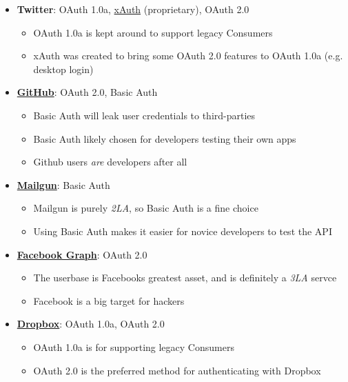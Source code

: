\documentclass{book}
\begin{document}
\begin{itemize}
\item \textbf{Twitter}: OAuth 1.0a, \href{https://dev.twitter.com/docs/oauth/xauth}{xAuth} (proprietary), OAuth 2.0
    \begin{itemize}
        \item OAuth 1.0a is kept around to support legacy Consumers
        \item xAuth was created to bring some OAuth 2.0 features to OAuth 1.0a (e.g. desktop login)
    \end{itemize}
\item \href{http://developer.github.com/v3/#authentication}{\textbf{GitHub}}: OAuth 2.0, Basic Auth
    \begin{itemize}
        \item Basic Auth will leak user credentials to third-parties
        \item Basic Auth likely chosen for developers testing their own apps
        \item Github users \emph{are} developers after all
    \end{itemize}
\item \href{http://documentation.mailgun.com/quickstart.html#authentication}{\textbf{Mailgun}}: Basic Auth
    \begin{itemize}
        \item Mailgun is purely \emph{2LA}, so Basic Auth is a fine choice
        \item Using Basic Auth makes it easier for novice developers to test the API
    \end{itemize}
\item \href{https://developers.facebook.com/docs/reference/dialogs/oauth/}{\textbf{Facebook Graph}}: OAuth 2.0
    \begin{itemize}
        \item The userbase is Facebooks greatest asset, and is definitely a \emph{3LA} servce
        \item Facebook is a big target for hackers
    \end{itemize}
\item \href{https://www.dropbox.com/developers/core/docs}{\textbf{Dropbox}}: OAuth 1.0a, OAuth 2.0
    \begin{itemize}
        \item OAuth 1.0a is for supporting legacy Consumers
        \item OAuth 2.0 is the preferred method for authenticating with Dropbox
    \end{itemize}
\end{itemize}
\end{document}
